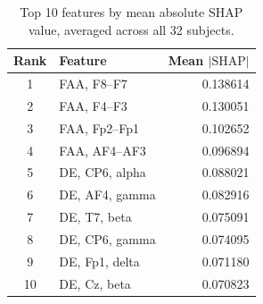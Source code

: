 \begin{table}[H]
  \centering
  \caption{Top 10 features by mean absolute SHAP value, averaged across all 32 subjects.}
  \label{tab:shap}
  \begin{tabular}{clr}
    \toprule
    Rank & Feature & Mean $|\mathrm{SHAP}|$ \\
    \midrule
    1 & FAA, F8--F7 & 0.138614 \\
    2 & FAA, F4--F3 & 0.130051 \\
    3 & FAA, Fp2--Fp1 & 0.102652 \\
    4 & FAA, AF4--AF3 & 0.096894 \\
    5 & DE, CP6, alpha & 0.088021 \\
    6 & DE, AF4, gamma & 0.082916 \\
    7 & DE, T7, beta & 0.075091 \\
    8 & DE, CP6, gamma & 0.074095 \\
    9 & DE, Fp1, delta & 0.071180 \\
    10 & DE, Cz, beta & 0.070823 \\
    \bottomrule
  \end{tabular}
\end{table}
